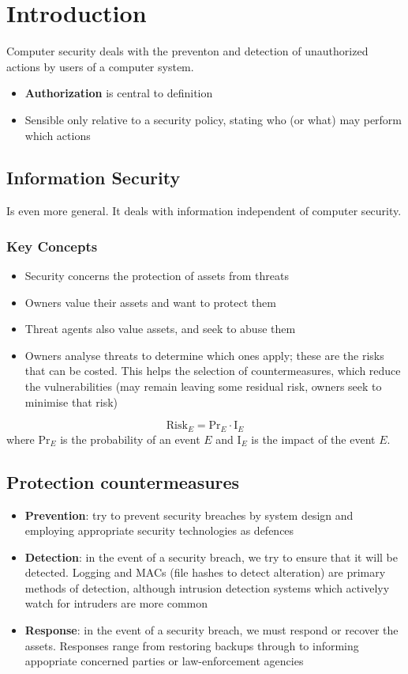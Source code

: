 \documentclass[12pt, a4paper]{report}
\begin{document}
\newpage
\tableofcontents
\chapter{Introduction}
Computer security deals with the preventon and detection of unauthorized actions by users of a computer system.
\begin{itemize}
    \item \textbf{Authorization} is central to definition
    \item Sensible only relative to a security policy, stating who (or what) may perform which actions
\end{itemize}
\section{Information Security}
Is even more general. It deals with information independent of computer security.
\subsection{Key Concepts}
\begin{itemize}
    \item Security concerns the protection of assets from threats
    \item Owners value their assets and want to protect them
    \item Threat agents also value assets, and seek to abuse them
    \item Owners analyse threats to determine which ones apply; these are the risks that can be costed. This helps the selection of countermeasures, which reduce the vulnerabilities (may remain leaving some residual risk, owners seek to minimise that risk)
\end{itemize}
\begin{equation*}
    \text{Risk}_{E} = \text{Pr}_{E} \cdot \text{I}_{E}
\end{equation*}
where $\text{Pr}_{E}$ is the probability of an event $E$ and $\text{I}_{E}$ is the impact of the event $E$.
\section{Protection countermeasures}
\begin{itemize}
    \item \textbf{Prevention}: try to prevent security breaches by system design and employing appropriate security technologies as defences
    \item \textbf{Detection}: in the event of a security breach, we try to ensure that it will be detected. Logging and MACs (file hashes to detect alteration)  are primary methods of detection, although intrusion detection systems which activelyy watch for intruders are more common
    \item \textbf{Response}: in the event of a security breach, we must respond or recover the assets. Responses range from restoring backups through to informing appopriate concerned parties or law-enforcement agencies
\end{itemize}
\end{document}
